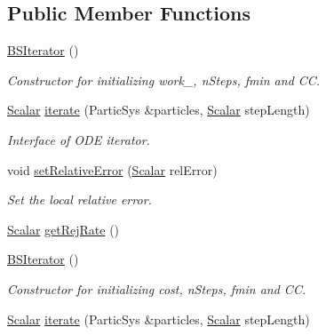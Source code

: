 \subsection*{Public Member Functions}
\begin{DoxyCompactItemize}
\item 
\mbox{\hyperlink{class_space_h_1_1_b_s_iterator_aef64ddf4540fa44e7c408e0ed7caabb2}{B\+S\+Iterator}} ()
\begin{DoxyCompactList}\small\item\em Constructor for initializing work\+\_\+, n\+Steps, fmin and CC. \end{DoxyCompactList}\item 
\mbox{\hyperlink{class_space_h_1_1_b_s_iterator_a89993409583b3022709bdfd84ea8149d}{Scalar}} \mbox{\hyperlink{class_space_h_1_1_b_s_iterator_a5ddc9dbcdecb554d58952c3b002e6b5e}{iterate}} (Partic\+Sys \&particles, \mbox{\hyperlink{class_space_h_1_1_b_s_iterator_a89993409583b3022709bdfd84ea8149d}{Scalar}} step\+Length)
\begin{DoxyCompactList}\small\item\em Interface of O\+DE iterator. \end{DoxyCompactList}\item 
void \mbox{\hyperlink{class_space_h_1_1_b_s_iterator_a8ac161c12bba12277bb9c881b692f60a}{set\+Relative\+Error}} (\mbox{\hyperlink{class_space_h_1_1_b_s_iterator_a89993409583b3022709bdfd84ea8149d}{Scalar}} rel\+Error)
\begin{DoxyCompactList}\small\item\em Set the local relative error. \end{DoxyCompactList}\item 
\mbox{\hyperlink{class_space_h_1_1_b_s_iterator_a89993409583b3022709bdfd84ea8149d}{Scalar}} \mbox{\hyperlink{class_space_h_1_1_b_s_iterator_a86345cb32e6cb2da0437a3697866501f}{get\+Rej\+Rate}} ()
\item 
\mbox{\hyperlink{class_space_h_1_1_b_s_iterator_aef64ddf4540fa44e7c408e0ed7caabb2}{B\+S\+Iterator}} ()
\begin{DoxyCompactList}\small\item\em Constructor for initializing cost, n\+Steps, fmin and CC. \end{DoxyCompactList}\item 
\mbox{\hyperlink{class_space_h_1_1_b_s_iterator_a89993409583b3022709bdfd84ea8149d}{Scalar}} \mbox{\hyperlink{class_space_h_1_1_b_s_iterator_afd196cc621849edd195622dfb5f83719}{iterate}} (Partic\+Sys \&particles, \mbox{\hyperlink{class_space_h_1_1_b_s_iterator_a89993409583b3022709bdfd84ea8149d}{Scalar}} step\+Length)

\end{DoxyCompactItemize}
